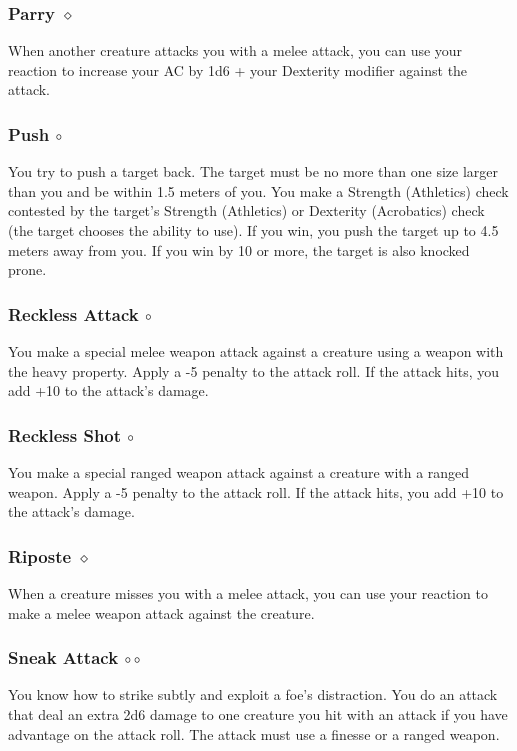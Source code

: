 \subsubsection{Parry $\diamond$} \label{act::parry}
    When another creature attacks you with a melee attack, you can use your reaction to increase your AC by 1d6 + your Dexterity modifier against the attack.

\subsubsection{Push $\circ$} \label{act::push}
    You try to push a target back.
    The target must be no more than one size larger than you and be within 1.5 meters of you.
    You make a Strength (Athletics) check contested by the target's Strength (Athletics) or Dexterity (Acrobatics) check (the target chooses the ability to use).
    If you win, you push the target up to 4.5 meters away from you.
    If you win by 10 or more, the target is also knocked prone.

\subsubsection{Reckless Attack $\circ$} \label{act::recklessattack}
    You make a special melee weapon attack against a creature using a weapon with the heavy property.
    Apply a -5 penalty to the attack roll.
    If the attack hits, you add +10 to the attack's damage.

\subsubsection{Reckless Shot $\circ$} \label{act::recklessshot}
    You make a special ranged weapon attack against a creature with a ranged weapon.
    Apply a -5 penalty to the attack roll.
    If the attack hits, you add +10 to the attack's damage.

\subsubsection{Riposte $\diamond$} \label{act::riposte}
    When a creature misses you with a melee attack, you can use your reaction to make a melee weapon attack against the creature.

\subsubsection{Sneak Attack $\circ\circ$} \label{act::sneakattack}
    You know how to strike subtly and exploit a foe's distraction.
    You do an attack that deal an extra 2d6 damage to one creature you hit with an attack if you have advantage on the attack roll.
    The attack must use a finesse or a ranged weapon.

